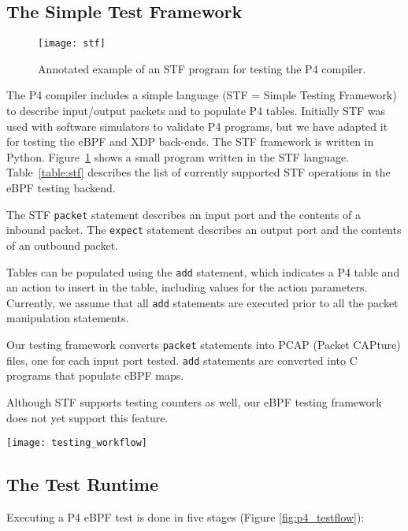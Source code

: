 \subsection{The Simple Test Framework}
\begin{figure}[h]
  \centering
  \texttt{[image: stf]}
  \caption{Annotated example of an STF program for testing the P4 compiler.}
  \label{fig:stf}
\end{figure}

The P4 compiler includes a simple language (STF = Simple Testing
Framework) to describe input/output packets and to populate P4 tables.
Initially STF was used with software simulators to validate P4
programs, but we have adapted it for testing the eBPF and XDP
back-ends.  The STF framework is written in Python.
Figure~\ref{fig:stf} shows a small program written in the STF
language.  Table~\ref{table:stf} describes the list of currently
supported STF operations in the eBPF testing backend.

The STF \texttt{packet} statement describes an input port and the
contents of a inbound packet.  The \texttt{expect} statement describes
an output port and the contents of an outbound packet.

Tables can be populated using the \texttt{add} statement, which
indicates a P4 table and an action to insert in the table, including
values for the action parameters.  Currently, we assume that all
\texttt{add} statements are executed prior to all the packet
manipulation statements.

Our testing framework converts \texttt{packet} statements into PCAP
(Packet CAPture) files, one for each input port tested.  \texttt{add}
statements are converted into C programs that populate eBPF maps.

Although STF supports testing counters as well, our eBPF testing
framework does not yet support this feature.

\begin{figure*}
	\centering
	\texttt{[image: testing\_workflow]}
	\caption{Testing workflow for a P4-eBPF program. Environment and
		target are provided by the user.}
	\label{fig:p4_testflow}
\end{figure*}

\subsection{The Test Runtime}


Executing a P4 eBPF test is done in five stages (Figure
\ref{fig:p4_testflow}):

